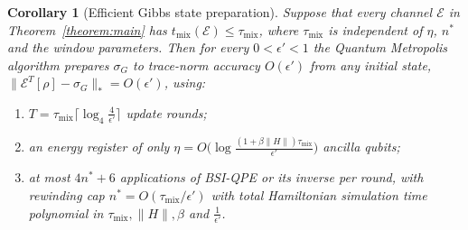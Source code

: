 \documentclass[aps,floatfix,10pt,amssymb,amsfont,amsmath,superscriptaddress,float,nofootinbib,longbibliography,nobalancelastpage,twocolumn]{revtex4-2}
\newtheorem{corollary}{Corollary}
\begin{document}
\begin{corollary}[Efficient Gibbs state preparation]
\label{corollary:polycost}
Suppose that every channel $\mathcal{E}$ in Theorem~\ref{theorem:main} has $t_{\mathrm{mix}}(\mathcal{E})\leq\tau_{\mathrm{mix}}$, where $\tau_{\mathrm{mix}}$ is independent of $\eta$, $n^*$ and the window parameters. Then for every $0<\epsilon'<1$ the Quantum Metropolis algorithm prepares $\sigma_G$ to trace-norm accuracy $O(\epsilon')$ from any initial state, $\|\mathcal{E}^T[\rho]-\sigma_G\|_*=O(\epsilon')$, using:
\begin{enumerate}
    \item[(i)] $T=\tau_{\mathrm{mix}}\big\lceil\log_4\frac{4}{\epsilon'}\big\rceil$ update rounds;
    \item[(ii)] an energy register of only $\eta=O\big(\log\frac{(1+\beta\|H\|)\tau_{\mathrm{mix}}}{\epsilon'}\big)$ ancilla qubits;
    \item[(iii)] at most $4n^*+6$ applications of BSI-QPE or its inverse per round, with rewinding cap $n^*=O(\tau_{\mathrm{mix}}/\epsilon')$ with total Hamiltonian simulation time polynomial in $\tau_{\mathrm{mix}}, \|H\|, \beta$ and  $\frac{1}{\epsilon'}$.
\end{enumerate}
\end{corollary}
\end{document}
